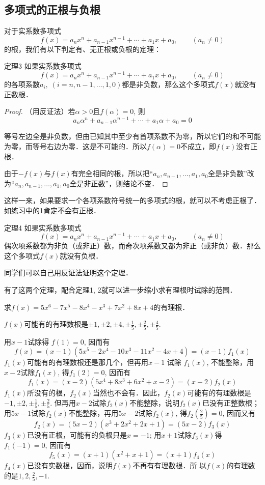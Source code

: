 \subsection{多项式的正根与负根}

对于实系数多项式
\[f(x)=a_nx^n+a_{n-1}x^{n-1}+\cdots+a_1x+a_0,\qquad (a_n\ne 0)\]
的根，我们有以下判定有、无正根或负根的定理：

\begin{blk}{定理3}
    如果实系数多项式
    \[f(x)=a_nx^n+a_{n-1}x^{n-1}+\cdots+a_1x+a_0,\qquad (a_n\ne 0)\]
    的各项系数$a_i,\; (i=n,n-1,\ldots,1, 0)$都是非负数，那么这个多项式$f(x)$就没有正数根．
\end{blk}

\begin{proof}
（用反证法）若$\alpha>0$且$f(\alpha)=0$, 则
\[a_n\alpha^n+a_{n-1}\alpha^{n-1}+\cdots+a_1\alpha+a_0=0\]

等号左边全是非负数，但由已知其中至少有首项系数不为零，所以它们的和不可能为零，而等号右边为零．这是不可能的．所以$f(\alpha)=0$不成立，即$f(x)$没有正根．

由于$-f(x)$与$f(x)$有完全相同的根，所以把“$a_n,a_{n-1},\ldots,a_1,a_0$全是非负数”改为“$a_n,a_{n-1},\ldots,a_1,a_0$全是非正数”，则结论不变．
\end{proof}

这样一来，如果要求一个各项系数符号统一的多项式的根，就可以不考虑正根了．如练习中的1肯定不会有正根．

\begin{blk}{定理4}
     如果实系数多项式
 \[f(x)=a_nx^n+a_{n-1}x^{n-1}+\cdots+a_1x+a_0,\qquad (a_n\ne 0)\]
偶次项系数都为非负（或非正）数，而奇次项系数又都为非正（或非负）数．那么这个多项式$f(x)$就没有负根．
\end{blk}

同学们可以自己用反证法证明这个定理．

有了这两个定理，配合定理1, 2就可以进一步缩小求有理根时试除的范围．

\begin{example}
    求$f(x)=5x^6-7x^5-8x^4-x^3+7x^2+8x+4$的有理根．
\end{example}

\begin{solution}
$f(x)$可能有的有理数根是$\pm 1,\pm 2,\pm 4,\pm \frac{1}{5},
\pm \frac{2}{5}, \pm \frac{4}{5}$.

用$x-1$试除得 $f(1)=0$, 因而有
\[f (x) = (x-1) (5x^5-2x^4-10x^3-11x^2-4x+4)=(x-1) f_1(x)\]
$f_1(x)$可能有的有理数根还是那几个，但再用$x-1$ 试除
$f_1(x)$, 不能整除，用$x-2$试除$f_1(x)$, 得$f_1(2)=0$, 因而有
\[f_1 (x) = (x-2) (5x^4+8x^3+6x^2+x-2)=(x-2)f_2(x)\]
$f_1(x)$所没有的根，$f_2(x)$当然也不会有．因此，$f_2(x)$可能有的有理数根是$-1,\pm 2,\pm \frac{1}{5},\pm \frac{2}{5}$. 但再用$x-2$试除$f_2(x)$不能整除，说明$f_2(x)$已没有正整数根；用$5x-1$试除$f_2(x)$不能整除，再用$5x-2$试除$f_2(x)$, 得$f_2\left(\frac{2}{5}\right)=0$, 
因而又有
\[f_2 (x) = (5x-2) (x^3+2x^2+2x+1)=(5x-2)f_3(x)\]
$f_3(x)$已没有正根，可能有的负根只是$x=-1$; 用$x+1$试除$f_3(x)$得$f_1(-1)=0$, 因而有
\[f_5 (x) = (x+1) (x^2+x+1)=(x+1)f_4(x)\]
$f_4(x)$已没有实数根，因而，说明$f(x)$不再有有理数根．所
以$f(x)$的有理数的是$1, 2,\frac{2}{5},-1$.
\end{solution}

